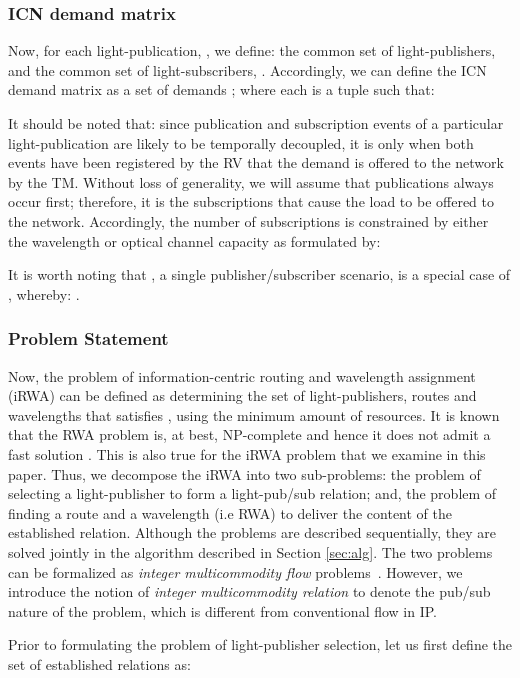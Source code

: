 \documentclass[journal]{IEEEtran}
\begin{document}
\subsubsection{ICN demand matrix}
\label{sec:icn-demand-matrix}

Now, for each light-publication, , we define: the common set of
light-publishers,  and the common set of light-subscribers,
. Accordingly, we can define the ICN demand matrix as a set of demands ; where each  is a tuple  such that: 

It should be noted that: since publication and subscription events of
a particular light-publication are
likely to be temporally decoupled, it is only when both events have
been registered by the RV that the demand is offered to the network by
the TM. Without loss of generality, we will assume that publications always
occur first; therefore, it is the subscriptions that cause the load to be offered to the
network. Accordingly, the number of subscriptions is constrained by
either the wavelength or optical channel capacity as formulated by:


It is worth noting that , a single publisher/subscriber scenario, is a special case of , whereby: .

\subsubsection{Problem Statement}
Now, the problem of information-centric routing and wavelength
assignment (iRWA) can be defined as determining the set of
light-publishers, routes and wavelengths that satisfies ,
using the minimum amount of resources. It is known that the RWA
problem is, at best, NP-complete and hence it does not admit a fast
solution \cite{raj:alloptic,ste:rwa}. This is also true for the iRWA
problem that we examine in this paper. Thus, we decompose the iRWA
into two sub-problems: the problem of selecting a light-publisher to
form a light-pub/sub relation; and, the problem of finding a route
and a wavelength (i.e RWA) to deliver the content of the established relation. Although the problems are described
sequentially, they are solved jointly in the algorithm described in Section
\ref{sec:alg}. The two problems can be formalized as \emph{integer
 multicommodity flow} problems~\cite{ahu:netflow,raj:alloptic,
 ozd:rwa}. However, we introduce the notion of \emph{integer
 multicommodity relation} to denote the pub/sub nature of the
problem, which is different from conventional flow in IP.

Prior to formulating the problem of light-publisher selection, let us first define the set of established relations  as:
  
\end{document}
